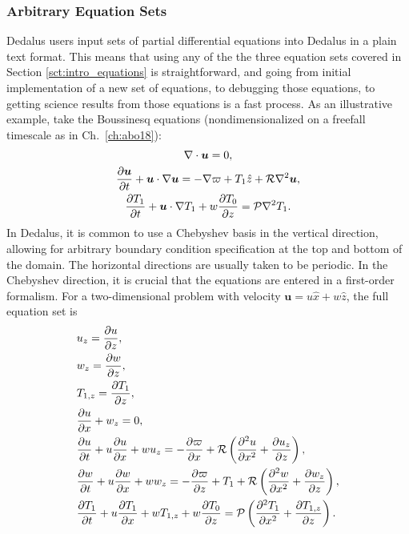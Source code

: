 \subsubsection{Arbitrary Equation Sets}
Dedalus users input sets of partial differential equations into Dedalus in a plain text format.
This means that using any of the the three equation sets covered in Section \ref{sct:intro_equations} is straightforward, and going from initial implementation of a new set of equations, to debugging those equations, to getting science results from those equations is a fast process.
As an illustrative example, take the Boussinesq equations (nondimensionalized on a freefall timescale as in Ch.~\ref{ch:abo18}):
\begin{gather}
\nabla\cdot\bm{u} = 0, \\
\frac{\partial \bm{u}}{\partial t} + \bm{u}\cdot\nabla \bm{u} = -\nabla\varpi + T_1 \hat{z} + \mathcal{R} \nabla^2\bm{u}, \\
\frac{\partial T_1}{\partial t} + \bm{u}\cdot\nabla T_1 + w\frac{\partial T_0}{\partial z} = \mathcal{P} \nabla^2 T_1.
\end{gather}
In Dedalus, it is common to use a Chebyshev basis in the vertical direction, allowing for arbitrary boundary condition specification at the top and bottom of the domain.
The horizontal directions are usually taken to be periodic.
In the Chebyshev direction, it is crucial that the equations are entered in a first-order formalism.
For a two-dimensional problem with velocity $\bm{u} = u\hat{x} + w\hat{z}$, the full equation set is
\begin{align}
&u_z = \frac{\partial u}{\partial z}, \label{eqn:dedalus1} \\
&w_z = \frac{\partial w}{\partial z}, \\
&T_{1,z} = \frac{\partial T_1}{\partial z}, \\
&\frac{\partial u}{\partial x} + w_z = 0, \\
&\frac{\partial u}{\partial t} + u\frac{\partial u}{\partial x} + w u_z = -\frac{\partial \varpi}{\partial x} + \mathcal{R} \left(\frac{\partial^2 u}{\partial x^2} + \frac{\partial u_z}{\partial z}\right),\\
&\frac{\partial w}{\partial t} + u\frac{\partial w}{\partial x} + w w_z = -\frac{\partial \varpi}{\partial z} + T_1 + \mathcal{R} \left(\frac{\partial^2 w}{\partial x^2} + \frac{\partial w_z}{\partial z}\right),\\
&\frac{\partial T_1}{\partial t} + u\frac{\partial T_1}{\partial x} + w T_{1,z}  + w \frac{\partial T_0}{\partial z} = \mathcal{P} \left(\frac{\partial^2 T_1}{\partial x^2} + \frac{\partial T_{1,z}}{\partial z}\right) \label{eqn:dedalus7}.
\end{align}
